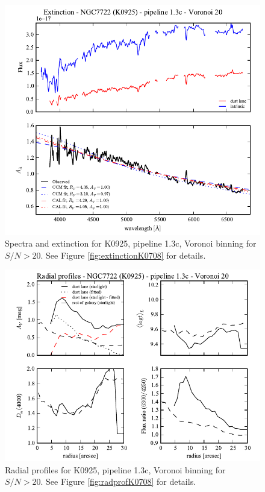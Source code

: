 \documentclass[a4paper]{article}
\begin{document}
\begin{figure}[H]
\includegraphics{figures/spectra_K0925_1.3c_v20.pdf}
\caption{Spectra and extinction for K0925, pipeline 1.3c, Voronoi binning for
$S/N > 20$. See Figure \ref{fig:extinctionK0708} for details.}
\end{figure}

\begin{figure}[H]
\includegraphics{figures/radprof_K0925_1.3c_v20.pdf}
\caption{Radial profiles for K0925, pipeline 1.3c, Voronoi binning for $S/N >
20$. See Figure \ref{fig:radprofK0708} for details.}
\label{fig:radprof_K0925_13c_v20}
\end{figure}
\end{document}
